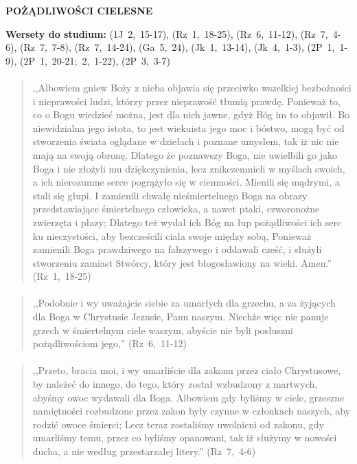 \documentclass[10pt,a4paper,oneside]{article}
\begin{document}
\centerline{\textbf{\MakeUppercase{Pożądliwości cielesne}}}
\begin{center}
\textbf{Wersety do studium:} \mbox{(1J 2, 15-17)}, \mbox{(Rz 1, 18-25)}, \mbox{(Rz 6, 11-12)}, \mbox{(Rz 7, 4-6)}, \mbox{(Rz 7, 7-8)}, \mbox{(Rz 7, 14-24)}, \mbox{(Ga 5, 24)}, \mbox{(Jk 1, 13-14)}, \mbox{(Jk 4, 1-3)}, \mbox{(2P 1, 1-9)}, \mbox{(2P 1, 20-21; 2, 1-22)}, \mbox{(2P 3, 3-7)}
\end{center}
\paragraph{}
\begin{quote}
,,Albowiem gniew Boży z nieba objawia się przeciwko wszelkiej bezbożności i nieprawości ludzi, którzy przez nieprawość tłumią prawdę. Ponieważ to, co o Bogu wiedzieć można, jest dla nich jawne, gdyż Bóg im to objawił. Bo niewidzialna jego istota, to jest wiekuista jego moc i bóstwo, mogą być od stworzenia świata oglądane w dziełach i poznane umysłem, tak iż nic nie mają na swoją obronę, Dlatego że poznawszy Boga, nie uwielbili go jako Boga i nie złożyli mu dziękczynienia, lecz znikczemnieli w myślach swoich, a ich nierozumne serce pogrążyło się w ciemności. Mienili się mądrymi, a stali się głupi. I zamienili chwałę nieśmiertelnego Boga na obrazy przedstawiające śmiertelnego człowieka, a nawet ptaki, czworonożne zwierzęta i płazy; Dlatego też wydał ich Bóg na łup pożądliwości ich serc ku nieczystości, aby bezcześcili ciała swoje między sobą, Ponieważ zamienili Boga prawdziwego na fałszywego i oddawali cześć, i służyli stworzeniu zamiast Stwórcy, który jest błogosławiony na wieki. Amen.'' \mbox{(Rz 1, 18-25)}
\end{quote}
\paragraph{}
\begin{quote}
,,Podobnie i wy uważajcie siebie za umarłych dla grzechu, a za żyjących dla Boga w Chrystusie Jezusie, Panu naszym. Niechże więc nie panuje grzech w śmiertelnym ciele waszym, abyście nie byli posłuszni pożądliwościom jego,'' \mbox{(Rz 6, 11-12)}
\end{quote}
\paragraph{}
\begin{quote}
,,Przeto, bracia moi, i wy umarliście dla zakonu przez ciało Chrystusowe, by należeć do innego, do tego, który został wzbudzony z martwych, abyśmy owoc wydawali dla Boga. Albowiem gdy byliśmy w ciele, grzeszne namiętności rozbudzone przez zakon były czynne w członkach naszych, aby rodzić owoce śmierci; Lecz teraz zostaliśmy uwolnieni od zakonu, gdy umarliśmy temu, przez co byliśmy opanowani, tak iż służymy w nowości ducha, a nie według przestarzałej litery.'' \mbox{(Rz 7, 4-6)}
\end{quote}
\end{document}
